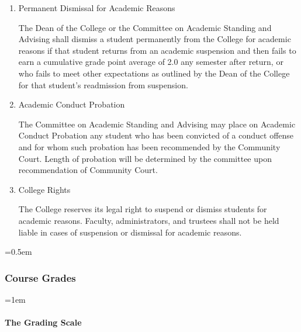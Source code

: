 \documentclass{manual}
\newcommand{\modified}[1]{}
\newcommand{\oldbreak}[1]{}
\let\oldsubsubsection\subsubsection
\renewcommand\subsubsection{\leftskip=0.5em\oldsubsubsection}
\let\oldparagraph\paragraph
\renewcommand\paragraph{\leftskip=1em\oldparagraph}
\newcommand{\itemLevelA}{\alph*.}
\newcommand{\itemRefA}{\alph*}
\begin{document}
\begin{enumerate}[label=\itemLevelA,ref=\itemRefA]
\item Permanent Dismissal for Academic Reasons \modified{4/14/09}      

The Dean of the College or the Committee on Academic Standing and Advising shall dismiss a student permanently from the College for academic reasons if that student returns from an academic suspension and then fails to earn a cumulative grade point average of 2.0 any semester after return, or who fails to meet other expectations as outlined by the Dean of the College for that student's readmission from suspension.

\oldbreak{VII-2}
\item Academic Conduct Probation

The Committee on Academic Standing and Advising may place on Academic Conduct Probation any student who has been convicted of a conduct offense and for whom such probation has been recommended by the Community Court. Length of probation will be determined by the committee upon recommendation of Community Court.

\item College Rights

The College reserves its legal right to suspend or dismiss students for academic reasons. Faculty, administrators, and trustees shall not be held liable in cases of suspension or dismissal for academic reasons.
\end{enumerate}

\oldbreak{VII-3}

\subsubsection{Course Grades}\label{sub:CourseGrades}

\paragraph{The Grading Scale}
\end{document}
